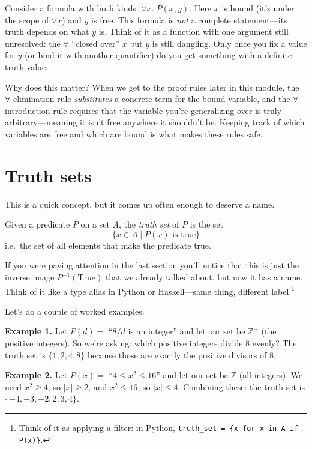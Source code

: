 \documentclass[11pt]{article}
\begin{document}
Consider a formula with both kinds: $\forall x.\; P(x, y)$. Here $x$ is bound (it's under the scope of $\forall x$) and $y$ is free. This formula is \emph{not} a complete statement---its truth depends on what $y$ is. Think of it as a function with one argument still unresolved: the $\forall$ ``closed over'' $x$ but $y$ is still dangling. Only once you fix a value for $y$ (or bind it with another quantifier) do you get something with a definite truth value.

Why does this matter? When we get to the proof rules later in this module, the $\forall$-elimination rule \emph{substitutes} a concrete term for the bound variable, and the $\forall$-introduction rule requires that the variable you're generalizing over is truly arbitrary---meaning it isn't free anywhere it shouldn't be. Keeping track of which variables are free and which are bound is what makes these rules safe.

\section{Truth sets}
This is a quick concept, but it comes up often enough to deserve a name.

\begin{definition}
Given a predicate $P$ on a set $A$, the \emph{truth set} of $P$ is the set
\[
\{x \in A \mid P(x) \text{ is true}\}
\]
i.e.\ the set of all elements that make the predicate true.
\end{definition}

If you were paying attention in the last section you'll notice that this is just the inverse image $P^{-1}(\text{True})$ that we already talked about, but now it has a name. Think of it like a type alias in Python or Haskell---same thing, different label.\footnote{Think of it as applying a filter: in Python, \texttt{truth\_set = \{x for x in A if P(x)\}}.}

Let's do a couple of worked examples.

\textbf{Example 1.} Let $P(d) = $ ``$8/d$ is an integer'' and let our set be $\mathbb{Z}^+$ (the positive integers). So we're asking: which positive integers divide 8 evenly? The truth set is $\{1, 2, 4, 8\}$ because those are exactly the positive divisors of 8.

\textbf{Example 2.} Let $P(x) = $ ``$4 \leq x^2 \leq 16$'' and let our set be $\mathbb{Z}$ (all integers). We need $x^2 \geq 4$, so $|x| \geq 2$, and $x^2 \leq 16$, so $|x| \leq 4$. Combining these: the truth set is $\{-4, -3, -2, 2, 3, 4\}$.
\end{document}
